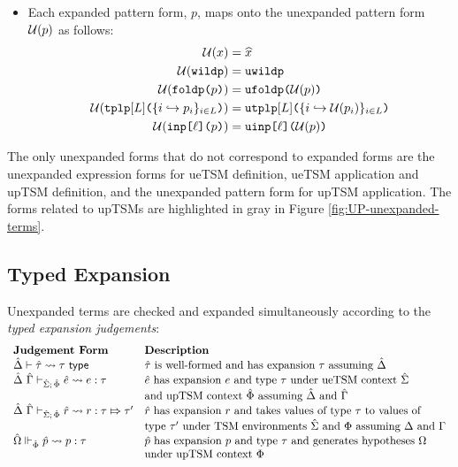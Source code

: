 {{{{\begin{itemize}
\begin{align*}
\end{align*}
\item Each expanded pattern form, $p$, maps onto the unexpanded pattern form $\mathcal{U}(p)$ as follows:
\begin{align*}
\mathcal{U}(x) & = \widehat{x}\\
\mathcal{U}(\texttt{wildp}) &= \texttt{uwildp}\\
\mathcal{U}(\texttt{foldp}\texttt{(}p\texttt{)}) &= \texttt{ufoldp}\texttt{(}\mathcal{U}(p)\texttt{)}\\
\mathcal{U}(\texttt{tplp}[L]\texttt{(}\{i \hookrightarrow p_{i}\}_{i \in L}\texttt{)}) & = \texttt{utplp}[L]\texttt{(}\{i \hookrightarrow \mathcal{U}(p_{i})\}_{i \in L}\texttt{)}\\
\mathcal{U}(\texttt{inp}\texttt{[}\ell\texttt{](}p\texttt{)}) & = \texttt{uinp}\texttt{[}\ell\texttt{](}\mathcal{U}(p)\texttt{)}
\end{align*}
\end{itemize}

The only unexpanded forms that do not correspond to expanded forms are the unexpanded expression forms for ueTSM definition, ueTSM application and upTSM definition, and the unexpanded pattern form for upTSM application. The forms related to upTSMs are highlighted in gray in Figure \ref{fig:UP-unexpanded-terms}.

\subsection{Typed Expansion}\label{sec:typed-expansion-UP}
Unexpanded terms are checked and expanded simultaneously according to the \emph{typed expansion judgements}:
\[\begin{array}{ll}
\textbf{Judgement Form} & \textbf{Description}\\
\hat{\Delta} \vdash {\hat\tau} \leadsto \tau~\mathsf{type} & \text{${\hat\tau}$ is well-formed and has expansion $\tau$ assuming $\hat{\Delta}$}\\
\hat{\Delta}~\hat{\Gamma} \vdash_{\hat{\Sigma};\,\hat\Phi} {\hat e} \leadsto e : \tau & \text{${\hat e}$ has expansion $e$ and type $\tau$ under ueTSM context $\hat{\Sigma}$}\\
& \text{and upTSM context $\hat\Phi$ assuming $\hat{\Delta}$ and $\hat{\Gamma}$}\\
\hat{\Delta}~\hat{\Gamma} \vdash_{\hat{\Sigma};\,\hat\Phi} \hat{r} \leadsto r : \tau \Mapsto \tau' & \text{$\hat{r}$ has expansion $r$ and takes values of type $\tau$ to values of}\\
& \text{type $\tau'$ under TSM environments $\hat{\Sigma}$ and $\Phi$ assuming $\Delta$ and $\Gamma$}\\
\hat\Omega \Vdash_{\hat\Phi} \hat{p} \leadsto p : \tau & \text{$\hat{p}$ has expansion $p$ and type $\tau$ and generates hypotheses $\Omega$ }\\
& \text{under upTSM context $\Phi$}
\end{array}\]

}}}}

